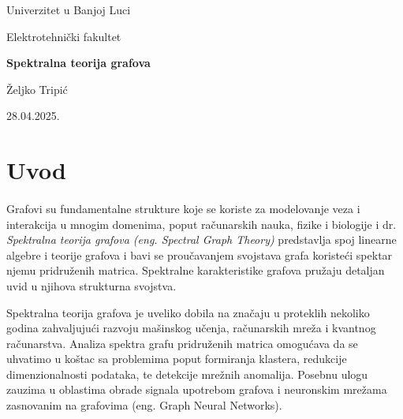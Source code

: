\documentclass[11pt]{article}
\begin{document}
	\begin{titlepage}
		\centering
		{\large Univerzitet u Banjoj Luci \par}  %
		{\large Elektrotehnički fakultet \par}  %

		\vspace{3cm}
		
		{\Huge \textbf{Spektralna teorija grafova} \par}  %
		\vspace{1cm}
		
		{\Large Željko Tripić \par}  %
		\vspace{1cm}
		

		\vfill  %
		
		{\large 28.04.2025. \par}  %
		
		
		
	\end{titlepage}
	

	\newpage
	\tableofcontents
	\newpage
	
	\section{Uvod}

	\paragraph{}
	Grafovi su fundamentalne strukture koje se koriste za modelovanje veza i interakcija u mnogim domenima, poput računarskih nauka, fizike i biologije i dr.
	\emph{Spektralna teorija grafova (eng. Spectral Graph Theory)} predstavlja spoj linearne algebre i teorije grafova i bavi se proučavanjem svojstava grafa koristeći spektar njemu pridruženih matrica.
	Spektralne karakteristike grafova pružaju detaljan uvid u njihova strukturna svojstva.

	Spektralna teorija grafova je uveliko dobila na značaju u proteklih nekoliko godina zahvaljujući razvoju mašinskog učenja, računarskih mreža i kvantnog računarstva.
	Analiza spektra grafu pridruženih matrica omogućava da se uhvatimo u koštac sa problemima poput formiranja klastera, redukcije dimenzionalnosti podataka, te detekcije mrežnih anomalija.
	Posebnu ulogu zauzima u oblastima obrade signala upotrebom grafova i neuronskim mrežama zasnovanim na grafovima (eng. Graph Neural Networks).
	
\end{document}

